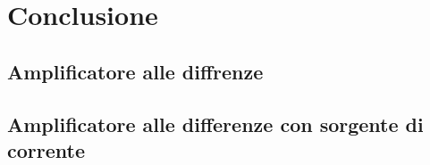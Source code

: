 \section*{Conclusione}

\subsection*{Amplificatore alle diffrenze}

\subsection*{Amplificatore alle differenze con sorgente di corrente}
